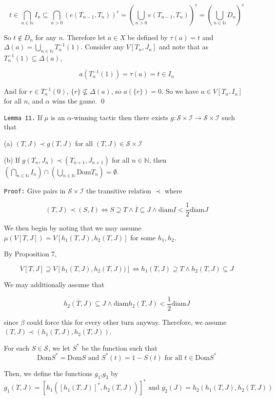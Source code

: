 \documentclass[12pt]{article}
\theoremstyle{plain}
\theoremstyle{definition}
\theoremstyle{remark}
\begin{document}
\[
t\in \bigcap_{n\in\mathbb{N}} I_n \subseteq \bigcap_{n>0} (e(T_{n-1},T_n))^c
=
\left(\bigcup_{n>0} e(T_{n-1},T_n)\right)^c
=
\left(\bigcup_{n\in\mathbb{N}} D_n\right)^c
\]

So $t\not\in D_n$ for any $n$. Therefore let $a\in X$ be defined by $\tau(a) = t$ and $\Delta(a) = \bigcup_{n\in\mathbb{N}}T_n^{-1}(1)$. Consider any $V[T_n,J_n]$ and note that as $T_n^{-1}(1)\subseteq \Delta(a)$,

\[a(T_n^{-1}(1))=\tau(a) = t \in I_n\]

And for $r\in T_n^{-1}(0)$, $\{r\}\not\subseteq \Delta(a)$, so $a(\{r\})=0$. So we have $a\in V[T_n,I_n]$ for all $n$, and $\alpha$ wins the game. \qed

\newpage

\texttt{Lemma 11.} If $\mu$ is an $\alpha$-winning tactic then there exists $g: \mathcal{S}\times\mathcal{I} \to \mathcal{S}\times\mathcal{I}$ such that

(a) $(T,J) \prec g(T,J)$ for all $(T,J)\in\mathcal{S}\times\mathcal{I}$

(b) If $g(T_n,J_n) \prec(T_{n+1},J_{n+1})$ for all $n\in\mathbb{N}$, then $\left(\bigcap_{n\in\mathbb{N}}I_n\right) \cap \left(\bigcup_{n\in\mathbb{N}}\textrm{Dom}T_n\right) =\emptyset$.

\texttt{Proof:} Give pairs in $\mathcal{S}\times\mathcal{I}$ the transitive relation $\prec$ where

\[(T,J)\prec (S,I) \Leftrightarrow S \supseteq T \wedge \overline{I}\subseteq J \wedge \textrm{diam} I < \frac{1}{2}\textrm{diam}J\]

We then begin by noting that we may assume $\mu(V[T,J])=V[h_1(T,J),h_2(T,J)]$ for some $h_1,h_2$.  

By Proposition 7,

\[V[T,J] \supseteq V[h_1(T,J),h_2(T,J))] \Leftrightarrow h_1(T,J) \supseteq T \wedge h_2(T,J) \subseteq J\]

We may additionally assume that

\[ \overline{h_2(T,J)} \subseteq J \wedge \textrm{diam} h_2(T,J) < \frac{1}{2} \textrm{diam} J\]

since $\beta$ could force this for every other turn anyway. Therefore, we assume $(T,J) \prec (h_1(T,J),h_2(T,J))$.

For each $S \in \mathcal{S}$, we let $S^*$ be the function such that \[\textrm{Dom}S^*=\textrm{Dom}S \text{ and } S^*(t)=1-S(t) \text{ for all } t\in \textrm{Dom}S^*\]

Then, we define the functions $g_1$,$g_2$ by \[g_1(T,J)=[h_1([h_1(T,J)]^*,h_2(T,J))]^* \text{ and } g_2(J)=h_2(h_1(T,J),h_2(T,J))\]
\end{document}
